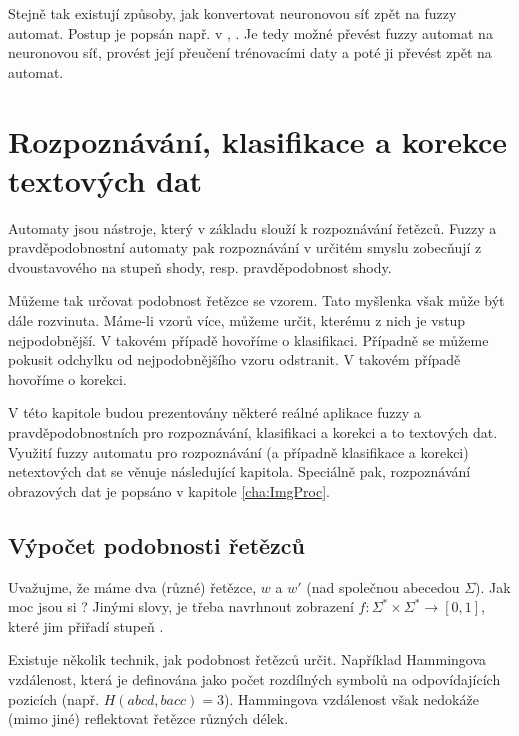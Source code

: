 \documentclass[a4paper,10pt]{article}
\begin{document}
Stejně tak existují způsoby, jak konvertovat neuronovou síť zpět na fuzzy automat. Postup je popsán např. v \cite{BlaDelFlo-MethIndFuzzAutUsNeuNet}, \cite{BlaDelPeg-FuzzGraIntUsiNeuNet}. Je tedy možné převést fuzzy automat na neuronovou síť, provést její přeučení trénovacími daty a poté ji převést zpět na automat.


\section{Rozpoznávání, klasifikace a korekce textových dat} \label{sec:Rec}
Automaty jsou nástroje, který v základu slouží k rozpoznávání řetězců. Fuzzy a pravděpodobnostní automaty pak rozpoznávání v určitém smyslu zobecňují z dvoustavového  na stupeň shody, resp. pravděpodobnost shody. 

Můžeme tak určovat podobnost řetězce se vzorem. Tato myšlenka však může být dále rozvinuta. Máme-li vzorů více, můžeme určit, kterému z nich je vstup nejpodobnější. V takovém případě hovoříme o klasifikaci. Případně se můžeme pokusit odchylku od nejpodobnějšího vzoru odstranit. V takovém případě hovoříme o korekci.

V této kapitole budou prezentovány některé reálné aplikace fuzzy a pravděpodobnostních pro rozpoznávání, klasifikaci a korekci a to textových dat. Využití fuzzy automatu pro rozpoznávání (a případně klasifikace a korekci) netextových dat se věnuje následující kapitola. Speciálně pak, rozpoznávání obrazových dat je popsáno v kapitole \ref{cha:ImgProc}.

\subsection{Výpočet podobnosti řetězců}
Uvažujme, že máme dva (různé) řetězce, $w$ a $w'$ (nad společnou abecedou $\Sigma$). Jak moc jsou si ? Jinými slovy, je třeba navrhnout zobrazení $f: \Sigma^* \times \Sigma^* \rightarrow [0,1]$, které jim přiřadí stupeň .

Existuje několik technik, jak podobnost řetězců určit. Například Hammingova vzdálenost, která je definována jako počet rozdílných symbolů na odpovídajících pozicích (např. $H(abcd, bacc) = 3$). Hammingova vzdálenost však nedokáže (mimo jiné) reflektovat řetězce různých délek.
\end{document}
